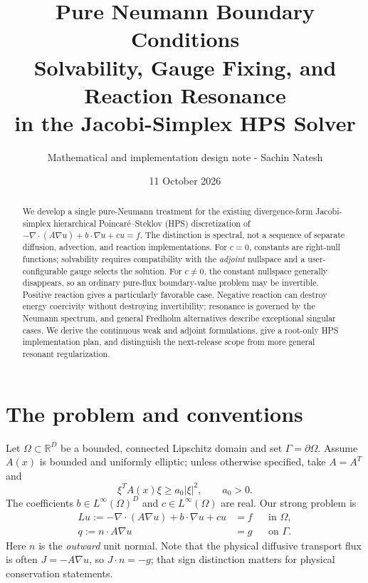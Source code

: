 \documentclass[11pt,letterpaper]{article}
\title{Pure Neumann Boundary Conditions\\[4pt]\large Solvability, Gauge Fixing, and Reaction Resonance\\in the Jacobi-Simplex HPS Solver}
\author{Mathematical and implementation design note - Sachin Natesh}
\date{11 October 2026}
\newcommand{\Om}{\Omega}
\newcommand{\Gm}{\Gamma}
\newcommand{\RR}{\mathbb R}
\begin{document}
\maketitle
\vspace{-1.3em}
\begin{abstract}
We develop a single pure-Neumann treatment for the existing divergence-form
Jacobi-simplex hierarchical Poincar\'e--Steklov (HPS) discretization of
$-\nabla\cdot(A\nabla u)+b\cdot\nabla u+cu=f$.
The distinction is spectral, not a sequence of separate diffusion, advection,
and reaction implementations. For $c=0$, constants are right-null functions;
solvability requires compatibility with the \emph{adjoint} nullspace and a
user-configurable gauge selects the solution. For $c\ne0$, the constant
nullspace generally disappears, so an ordinary pure-flux boundary-value
problem may be invertible. Positive reaction gives a particularly favorable
case. Negative reaction can destroy energy coercivity without destroying
invertibility; resonance is governed by the Neumann spectrum, and general
Fredholm alternatives describe exceptional singular cases. We derive the
continuous weak and adjoint formulations, give a root-only HPS implementation
plan, and distinguish the next-release scope from more general resonant
regularization.
\end{abstract}

\section{The problem and conventions}
Let $\Om\subset\RR^D$ be a bounded, connected Lipschitz domain and set
$\Gm=\partial\Om$. Assume $A(x)$ is bounded and uniformly elliptic; unless
otherwise specified, take $A=A^T$ and
\begin{equation}
 \xi^T A(x)\xi\ge a_0|\xi|^2,\qquad a_0>0.
 \label{eq:ellipticity}
\end{equation}
The coefficients $b\in L^\infty(\Om)^D$ and $c\in L^\infty(\Om)$ are real.
Our strong problem is
\begin{equation}\label{eq:problem}
 \boxed{\begin{aligned}
 Lu:=-\nabla\cdot(A\nabla u)+b\cdot\nabla u+cu&=f
       &&\text{in }\Om,\\
 q:=n\cdot A\nabla u&=g
       &&\text{on }\Gm.
 \end{aligned}}
\end{equation}
Here $n$ is the \emph{outward} unit normal. Note that the physical diffusive
transport flux is often $J=-A\nabla u$, so $J\cdot n=-g$; that sign distinction
matters for physical conservation statements.
\end{document}
